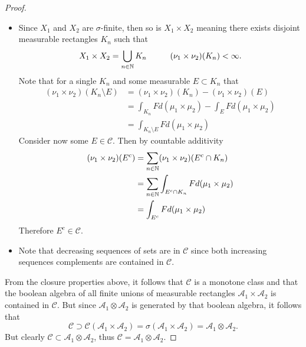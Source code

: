 \documentclass[hw_all.tex]{subfiles}
\begin{document}
\begin{proof}
\begin{itemize}
        \item[\textbf{Complements})]
            Since $X_1$ and $X_2$ are $\sigma$-finite, then so is $X_1 \times X_2$ meaning there exists disjoint measurable rectangles $K_n$ such that
            \[
                X_1 \times X_2 = \bigcup_{n \in \mathbb{N}} K_n \hspace{1cm} (\nu_1 \times \nu_2)(K_n) < \infty
            .\]
            Note that for a single $K_n$ and some measurable $E \subset K_n$ that
            \begin{align*}
                (\nu_1 \times \nu_2)(K_n \setminus E) &= (\nu_1 \times \nu_2)(K_n) - (\nu_1 \times \nu_2)(E) \\
                &= \int_{K_n} F d(\mu_1 \times \mu_2) - \int_{E} F d(\mu_1 \times \mu_2) \\
                &= \int_{K_n \setminus E} F d(\mu_1 \times \mu_2)
            \end{align*}
            Consider now some $E \in \mathcal{C}$. Then by countable additivity
            \begin{align*}
                (\nu_1 \times \nu_2)(E^c) &= \sum_{n \in \mathbb{N}} (\nu_1 \times \nu_2)(E^c \cap K_n) \\
                &= \sum_{n \in \mathbb{N}} \int_{E^c \cap K_n} F d(\mu_1 \times \mu_2) \\
                &= \int_{E^c} F d(\mu_1 \times \mu_2)
            \end{align*}
            Therefore $E^c \in \mathcal{C}$.

        \item[\textbf{Decreasing Seq.})]
            Note that decreasing sequences of sets are in $\mathcal{C}$ since both increasing sequences complements are contained in $\mathcal{C}$.
    \end{itemize}
    From the closure properties above, it follows that $\mathcal{C}$ is a monotone class and that the boolean algebra of all finite unions of measurable rectangles $\mathcal{A}_1 \times \mathcal{A}_2$ is contained in $\mathcal{C}$. But since $\mathcal{A}_1 \otimes \mathcal{A}_2$ is generated by that boolean algebra, it follows that
    \[
        \mathcal{C} \supset \mathcal{C}(\mathcal{A_1} \times \mathcal{A_2}) = \sigma(\mathcal{A}_1 \times \mathcal{A}_2) = \mathcal{A}_1 \otimes \mathcal{A}_2
    .\]
    But clearly $\mathcal{C} \subset \mathcal{A}_1 \otimes \mathcal{A}_2$, thus $\mathcal{C} = \mathcal{A}_1 \otimes \mathcal{A}_2$.
\end{proof}
\end{document}
